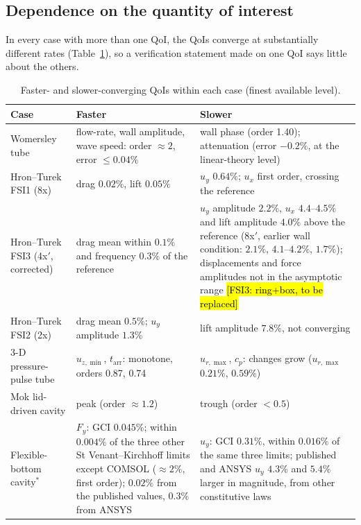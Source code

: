 \subsection{Dependence on the quantity of interest}\label{sec:qoi_dependence}

In every case with more than one QoI, the QoIs converge at substantially different rates (Table~\ref{tab:qoi_dependence}), so a verification statement made on one QoI says little about the others.

\begin{table}[htbp]
	\centering
	\footnotesize
	\setlength{\tabcolsep}{3pt}
	\caption{Faster- and slower-converging QoIs within each case (finest available level).}
	\label{tab:qoi_dependence}
	\begin{tabular}{p{2.8cm}p{5.4cm}p{5.4cm}}
		\toprule
		Case & Faster & Slower \\
		\midrule
		Womersley tube & flow-rate, wall amplitude, wave speed: order $\approx2$, error $\leq0.04\%$ & wall phase (order 1.40); attenuation (error $-0.2\%$, at the linear-theory level) \\
		Hron--Turek FSI1 (8x) & drag $0.02\%$, lift $0.05\%$ & $u_y$ $0.64\%$; $u_x$ first order, crossing the reference \\
		Hron--Turek FSI3 (4x$'$, corrected) & drag mean within $0.1\%$ and frequency $0.3\%$ of the reference & $u_y$ amplitude $2.2\%$, $u_x$ $4.4$--$4.5\%$ and lift amplitude $4.0\%$ above the reference (8x$'$, earlier wall condition: $2.1\%$, $4.1$--$4.2\%$, $1.7\%$); displacements and force amplitudes not in the asymptotic range \hl{[FSI3: ring+box, to be replaced]} \\
		Hron--Turek FSI2 (2x) & drag mean $0.5\%$; $u_y$ amplitude $1.3\%$ & lift amplitude $7.8\%$, not converging \\
		3-D pressure-pulse tube & $u_{z,\min}$, $t_\mathrm{arr}$: monotone, orders 0.87, 0.74 & $u_{r,\max}$, $c_p$: changes grow ($u_{r,\max}$ $0.21\%$, $0.59\%$) \\
		Mok lid-driven cavity & peak (order $\approx1.2$) & trough (order $<0.5$) \\
		Flexible-bottom cavity$^\ast$ & $F_y$: GCI $0.045\%$; within $0.004\%$ of the three other St Venant--Kirchhoff limits except COMSOL ($\approx2\%$, first order); $0.02\%$ from the published values, $0.3\%$ from ANSYS & $u_y$: GCI $0.31\%$, within $0.016\%$ of the same three limits; published and ANSYS $u_y$ $4.3\%$ and $5.4\%$ larger in magnitude, from other constitutive laws \\
				\bottomrule
	\end{tabular}
\end{table}

